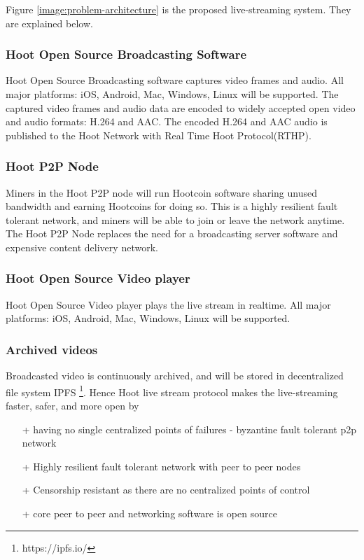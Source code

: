 \documentclass{article}
\begin{document}
Figure \ref{image:problem-architecture} is the proposed live-streaming system. They are explained below.
\subsubsection{Hoot Open Source Broadcasting Software}
Hoot Open Source Broadcasting software captures video frames and audio. All major platforms: iOS, Android, Mac, Windows, Linux will be supported. The captured video frames and audio data are encoded to widely accepted open video and audio formats: H.264 and AAC. The encoded H.264 and AAC audio is published to the Hoot Network with Real Time Hoot Protocol(RTHP).

\subsubsection{Hoot P2P Node}
Miners in the Hoot P2P node will run Hootcoin software sharing unused bandwidth and earning Hootcoins for doing so. This is a highly resilient fault tolerant network, and miners will be able to join or leave the network anytime. The Hoot P2P Node replaces the need for a broadcasting server software and expensive content delivery network.

\subsubsection{Hoot Open Source Video player}
Hoot Open Source Video player plays the live stream in realtime. All major platforms: iOS, Android, Mac, Windows, Linux will be supported.

\subsubsection{Archived videos}
Broadcasted video is continuously archived, and will be stored in decentralized file system IPFS \footnote{https://ipfs.io/}. Hence Hoot live stream protocol makes the live-streaming faster, safer, and more open by
\begin{itemize}
  \item[+]having no single centralized points of failures - byzantine fault tolerant p2p network
  \item[+]Highly resilient fault tolerant network with peer to peer nodes
  \item[+]Censorship resistant as there are no centralized points of control
  \item[+]core peer to peer and networking software is open source
\end{itemize}
\end{document}
